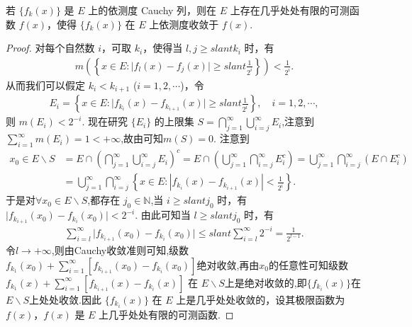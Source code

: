 \documentclass[../../main.tex]{subfiles}
\begin{document}
\begin{theorem}\label{theorem:定理3.16}
若 $\{f_k(x)\}$ 是 $E$ 上的依测度 Cauchy 列，则在 $E$ 上存在几乎处处有限的可测函数 $f(x)$，使得 $\{f_k(x)\}$ 在 $E$ 上依测度收敛于 $f(x)$.
\end{theorem}
\begin{proof}
对每个自然数 $i$，可取 $k_i$，使得当 $l,j\geqslant slant k_i$ 时，有
\begin{align*}
m\left(\left\{x\in E:\vert f_l(x)-f_j(x)\vert\geqslant slant\frac{1}{2^i}\right\}\right)<\frac{1}{2^i}.
\end{align*}
从而我们可以假定 $k_i<k_{i + 1}$ ($i = 1,2,\cdots$)，令
\begin{align*}
E_i=\left\{x\in E:\vert f_{k_i}(x)-f_{k_{i + 1}}(x)\vert\geqslant slant\frac{1}{2^i}\right\},\quad i = 1,2,\cdots,
\end{align*}
则 $m(E_i)<2^{-i}$. 现在研究 $\{E_i\}$ 的上限集 $S = \bigcap_{j = 1}^{\infty}\bigcup_{i = j}^{\infty}E_i$,注意到$\sum_{i = 1}^{\infty}m(E_i)=1<+\infty$,故由可知$m(S)=0$. 注意到
\begin{align*}
x_0\in E\backslash S&=E\cap \left( \bigcap_{j=1}^{\infty}{\bigcup_{i=j}^{\infty}{E_i}} \right) ^c=E\cap \left( \bigcup_{j=1}^{\infty}{\bigcap_{i=j}^{\infty}{E_{i}^{c}}} \right) =\bigcup_{j=1}^{\infty}{\bigcap_{i=j}^{\infty}{\left( E\cap E_{i}^{c} \right)}}
\\
&=\bigcup_{j=1}^{\infty}{\bigcap_{i=j}^{\infty}{\left\{ x\in E:\left| f_{k_i}\left( x \right) -f_{k_{i+1}}\left( x \right) \right|<\frac{1}{2^i} \right\}}}.
\end{align*}
于是对$\forall x_0\in E\backslash S$,都存在 $j_0\in \mathbb{N}$,当 $i\geqslant slant j_0$ 时，有$\vert f_{k_{i + 1}}(x_0)-f_{k_i}(x_0)\vert<2^{-i}$. 由此可知当 $l\geqslant slant j_0$ 时，有
\begin{align*}
\sum_{i = l}^{\infty}\vert f_{k_{i + 1}}(x_0)-f_{k_i}(x_0)\vert\leqslant slant \sum_{i=l}^{\infty}{2^{-i}} = \frac{1}{2^{l - 1}}.
\end{align*}
令$l\to +\infty$,则由Cauchy收敛准则可知,级数$f_{k_1}(x_0)+\sum_{i=1}^{\infty}[f_{k_{i+1}}(x_0)-f_{k_i}(x_0)]$绝对收敛,再由$x_0$的任意性可知级数$f_{k_1}(x)+\sum_{i = 1}^{\infty}[f_{k_{i + 1}}(x)-f_{k_i}(x)]$ 在 $E\backslash S$上是绝对收敛的,即$\{f_{k_i}(x)\}$在$E\backslash S$上处处收敛.因此 $\{f_{k_i}(x)\}$ 在 $E$ 上是几乎处处收敛的，设其极限函数为 $f(x)$，$f(x)$ 是 $E$ 上几乎处处有限的可测函数.


\end{proof}
\end{document}
